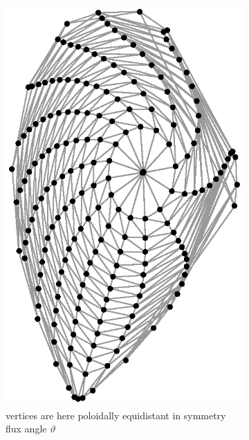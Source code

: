 \documentclass[./main.tex]{subfiles}
\begin{document}
\begin{figure}[ht!]
	\begin{subfigure}[b]{0.45\textwidth}
		\centering
		\includegraphics[width=1.0\textwidth]{figures/grid_flux_theta_meshed.eps}
		\captionsetup{width=1\textwidth}
		\caption{vertices are here poloidally equidistant in symmetry flux angle $\vartheta$}
		\label{fig:grid_theta_flux}
	\end{subfigure}
	\hfill
	\begin{subfigure}[b]{0.45\textwidth}

\end{subfigure}
\end{figure}
\end{document}
